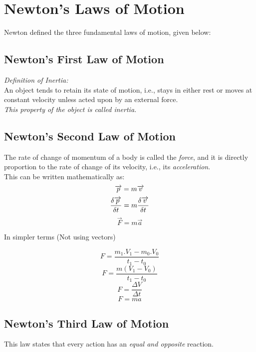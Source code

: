 \documentclass{acmart}
\begin{document}
    \section*{Newton's Laws of Motion}
    Newton defined the three fundamental laws of motion, given below:
    \subsection{Newton's First Law of Motion}
    \textit{Definition of Inertia:}\\
    An object tends to retain its state of motion, i.e., stays in either rest or moves at constant velocity unless acted upon by an external force.\\
    \textit{This property of the object is called inertia.}

    \subsection{Newton's Second Law of Motion}
    The rate of change of momentum of a body is called the \textit{force}, and it is directly proportion to the rate of change of its velocity, i.e., its \textit{acceleration}.\\
    This can be written mathematically as:\\
    \[
        \overrightarrow{p} = m\overrightarrow{v}\\
    \]
    \[
        \frac{\delta\overrightarrow{p}}{\delta t} = m\frac{\delta\overrightarrow{v}}{\delta t}\\
    \]
    \[
        \overrightarrow{F} = m\overrightarrow{a}
    \]


    In simpler terms (Not using vectors)

    \[
        F = \frac{m_1.V_1-m_0.V_0}{t_1-t_0}
    \]   
    \[
        F = \frac{m(V_1-V_0)}{t_1-t_0}
    \]
    \[
        F = \frac{\Delta V}{\Delta t}
    \]  
    \[
        F = ma
    \]

    \subsection{Newton's Third Law of Motion}
    This law states that every action has an \textit{equal and opposite} reaction.
    
\end{document}
